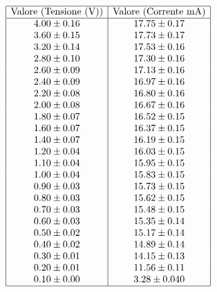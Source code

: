 \documentclass[a4paper,11pt]{article}
\begin{document}
\[
\begin{array}{|c|c|}
\hline
\text{Valore (Tensione (V))} & \text{Valore (Corrente mA)} \\ \hline
4.00 \pm 0.16 & 17.75 \pm 0.17 \\ 
3.60 \pm 0.15 & 17.73 \pm 0.17 \\ 
3.20 \pm 0.14 & 17.53 \pm 0.16 \\ 
2.80 \pm 0.10 & 17.30 \pm 0.16 \\ 
2.60 \pm 0.09 & 17.13 \pm 0.16 \\ 
2.40 \pm 0.09 & 16.97 \pm 0.16 \\ 
2.20 \pm 0.08 & 16.80 \pm 0.16 \\ 
2.00 \pm 0.08 & 16.67 \pm 0.16 \\ 
1.80 \pm 0.07 & 16.52 \pm 0.15 \\ 
1.60 \pm 0.07 & 16.37 \pm 0.15 \\ 
1.40 \pm 0.07 & 16.19 \pm 0.15 \\ 
1.20 \pm 0.04 & 16.03 \pm 0.15 \\ 
1.10 \pm 0.04 & 15.95 \pm 0.15 \\ 
1.00 \pm 0.04 & 15.83 \pm 0.15 \\ 
0.90 \pm 0.03 & 15.73 \pm 0.15 \\ 
0.80 \pm 0.03 & 15.62 \pm 0.15 \\ 
0.70 \pm 0.03 & 15.48 \pm 0.15 \\ 
0.60 \pm 0.03 & 15.35 \pm 0.14 \\ 
0.50 \pm 0.02 & 15.17 \pm 0.14 \\ 
0.40 \pm 0.02 & 14.89 \pm 0.14 \\ 
0.30 \pm 0.01 & 14.15 \pm 0.13 \\ 
0.20 \pm 0.01 & 11.56 \pm 0.11 \\ 
0.10 \pm 0.00 & 3.28 \pm 0.040 \\ \hline
\end{array}
\]
\end{document}
